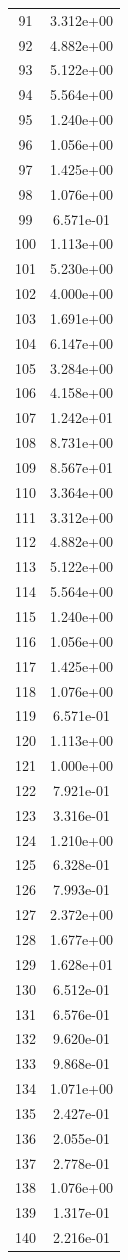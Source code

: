 \documentclass[12pt]{article}
\begin{document}
\begin{longtable}{@{}cc@{}}
91 & 3.312e+00 \\
92 & 4.882e+00 \\
93 & 5.122e+00 \\
94 & 5.564e+00 \\
95 & 1.240e+00 \\
96 & 1.056e+00 \\
97 & 1.425e+00 \\
98 & 1.076e+00 \\
99 & 6.571e-01 \\
100 & 1.113e+00 \\
101 & 5.230e+00 \\
102 & 4.000e+00 \\
103 & 1.691e+00 \\
104 & 6.147e+00 \\
105 & 3.284e+00 \\
106 & 4.158e+00 \\
107 & 1.242e+01 \\
108 & 8.731e+00 \\
109 & 8.567e+01 \\
110 & 3.364e+00 \\
111 & 3.312e+00 \\
112 & 4.882e+00 \\
113 & 5.122e+00 \\
114 & 5.564e+00 \\
115 & 1.240e+00 \\
116 & 1.056e+00 \\
117 & 1.425e+00 \\
118 & 1.076e+00 \\
119 & 6.571e-01 \\
120 & 1.113e+00 \\
121 & 1.000e+00 \\
122 & 7.921e-01 \\
123 & 3.316e-01 \\
124 & 1.210e+00 \\
125 & 6.328e-01 \\
126 & 7.993e-01 \\
127 & 2.372e+00 \\
128 & 1.677e+00 \\
129 & 1.628e+01 \\
130 & 6.512e-01 \\
131 & 6.576e-01 \\
132 & 9.620e-01 \\
133 & 9.868e-01 \\
134 & 1.071e+00 \\
135 & 2.427e-01 \\
136 & 2.055e-01 \\
137 & 2.778e-01 \\
138 & 1.076e+00 \\
139 & 1.317e-01 \\
140 & 2.216e-01 \\

\bottomrule
\end{longtable}
\end{document}
